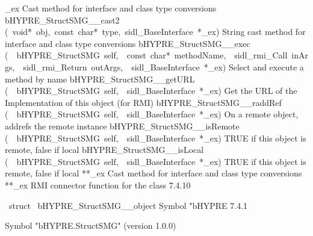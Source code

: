 \documentclass{article}
\begin{document}
\begin{cxxentry}
\begin{cxxentry}
\begin{cxxnames}
        {\_ex}
        {}
        {
Cast method for interface and class type conversions}
        {}
\label{cxx.7.4.29}
        {bHYPRE\_StructSMG\_\_cast2}
        {(\ void*\ obj,\ const\ char*\ type,\ sidl\_BaseInterface\ *\_ex)}
        {
String cast method for interface and class type conversions}
        {}
\label{cxx.7.4.30}
        {bHYPRE\_StructSMG\_\_exec}
        {(\ \ bHYPRE\_StructSMG\ self,\ \ const\ char*\ methodName,\ \ sidl\_rmi\_Call\ inArgs,\ \ sidl\_rmi\_Return\ outArgs,\ \ sidl\_BaseInterface\ *\_ex)}
        {
Select and execute a method by name}
        {}
\label{cxx.7.4.31}
        {bHYPRE\_StructSMG\_\_getURL}
        {(\ \ bHYPRE\_StructSMG\ self,\ \ sidl\_BaseInterface\ *\_ex)}
        {
Get the URL of the Implementation of this object (for RMI)}
        {}
\label{cxx.7.4.32}
        {bHYPRE\_StructSMG\_\_raddRef}
        {(\ \ bHYPRE\_StructSMG\ self,\ \ sidl\_BaseInterface\ *\_ex)}
        {
On a remote object, addrefs the remote instance}
        {}
\label{cxx.7.4.33}
        {bHYPRE\_StructSMG\_\_isRemote}
        {(\ \ bHYPRE\_StructSMG\ self,\ \ sidl\_BaseInterface\ *\_ex)}
        {
TRUE if this object is remote, false if local}
        {}
\label{cxx.7.4.34}
        {bHYPRE\_StructSMG\_\_isLocal}
        {(\ \ bHYPRE\_StructSMG\ self,\ \ sidl\_BaseInterface\ *\_ex)}
        {
TRUE if this object is remote, false if local}
        {}
\label{cxx.7.4.35}
        {**\_ex}
        {}
        {
Cast method for interface and class type conversions}
        {}
\label{cxx.7.4.36}
        {**\_ex}
        {}
        {
RMI connector function for the class}
        {7.4.10}
\end{cxxnames}
\begin{cxxvariable}
{\ struct\ }
        {bHYPRE\_StructSMG\_\_object}
        {}
        {
Symbol "bHYPRE}
        {7.4.1}
\begin{cxxdoc}

Symbol "bHYPRE.StructSMG" (version 1.0.0)


\end{cxxdoc}
\end{cxxvariable}
\end{cxxentry}
\end{cxxentry}
\end{document}
